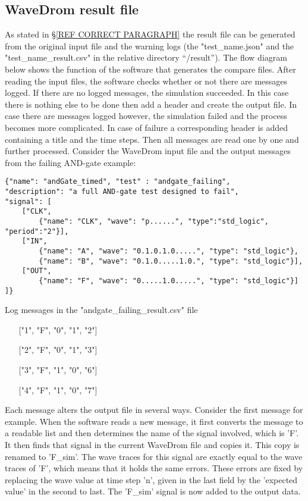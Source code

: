\subsection{WaveDrom result file}
As stated in §\ref{REF CORRECT PARAGRAPH} the result file can be generated from the original input file and the warning logs (the "test\_name.json" and the "test\_name\_result.csv" in the relative directory “/result”). The flow diagram below shows the function of the software that generates the compare files.
\newpage\noindent
After reading the input files, the software checks whether or not there are messages logged. If there are no logged messages, the simulation succeeded. In this case there is nothing else to be done then add a header and create the output file. In case there are messages logged however, the simulation failed and the process becomes more complicated.
\npar
In case of failure a corresponding header is added containing a title and the time steps. Then all messages are read one by one and further processed.
\npar
Consider the WaveDrom input file and the output messages from the failing AND-gate example:
\begin{lstlisting}[style=json, caption={Source file for a failing AND-gate example}, label={json:andgate_failing}]
{"name": "andGate_timed", "test" : "andgate_failing", 
"description": "a full AND-gate test designed to fail", 
"signal": [
	["CLK",
		{"name": "CLK", "wave": "p......", "type":"std_logic", "period":"2"}],
	["IN",
		{"name": "A", "wave": "0.1.0.1.0.....", "type": "std_logic"},
		{"name": "B", "wave": "0.1.0.....1.0.", "type": "std_logic"}],
	["OUT",
		{"name": "F", "wave": "0.....1.0.....", "type": "std_logic"}]
]}
\end{lstlisting}\noindent
\begin{customenv}
	\caption{Log messages in the "andgate\_failing\_result.csv" file}
	\begin{itemize}
		\item [] ["1", "F", "0", "1", "2"]
		\item [] ["2", "F", "0", "1", "3"]
		\item [] ["3", "F", "1", "0", "6"]
		\item [] ["4", "F", "1", "0", "7"]
	\end{itemize}
\end{customenv}\nline
Each message alters the output file in several ways. Consider the first message for example. When the software reads a new message, it first converts the message to a readable list and then determines the name of the signal involved, which is 'F'. It then finds that signal in the current WaveDrom file and copies it. This copy is renamed to 'F\_sim'. The wave traces for this signal are exactly equal to the wave traces of 'F', which means that it holds the same errors. These errors are fixed by replacing the wave value at time step 'n', given in the last field by the 'expected value' in the second to last. The 'F\_sim' signal is now added to the output data. 
